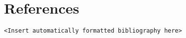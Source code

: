 \documentclass[
  11pt,
]{report}
\begin{document}
\hypertarget{references}{%
\chapter{References}\label{references}}

\texttt{\textless{}Insert\ automatically\ formatted\ bibliography\ here\textgreater{}}
\end{document}
